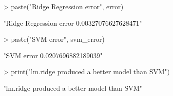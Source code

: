 \documentclass{article}
\begin{document}
\begin{Schunk}
\begin{Sinput}
> paste("Ridge Regression error", error)
\end{Sinput}
\begin{Soutput}
[1] "Ridge Regression error 0.00327076627628471"
\end{Soutput}
\begin{Sinput}
> paste("SVM error", svm_error)
\end{Sinput}
\begin{Soutput}
[1] "SVM error 0.0207696882189039"
\end{Soutput}
\begin{Sinput}
> print("lm.ridge produced a better model than SVM")
\end{Sinput}
\begin{Soutput}
[1] "lm.ridge produced a better model than SVM"
\end{Soutput}
\end{Schunk}
\end{document}
